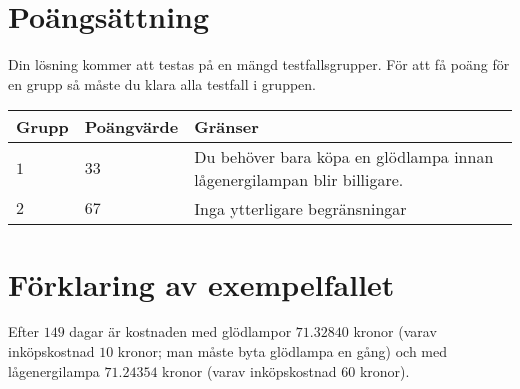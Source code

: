 \section*{Poängsättning}
Din lösning kommer att testas på en mängd testfallsgrupper.
För att få poäng för en grupp så måste du klara alla testfall i gruppen.

\noindent
\begin{tabular}{| l | l | l |}
  \hline
  Grupp & Poängvärde & Gränser \\ \hline
    $1$    & $33$        &  Du behöver bara köpa en glödlampa innan lågenergilampan blir billigare. \\ \hline
  $2$    & $67$        &  Inga ytterligare begränsningar \\ \hline
\end{tabular}

\section*{Förklaring av exempelfallet}
Efter $149$ dagar är kostnaden med glödlampor $71.32840$ kronor (varav inköpskostnad $10$ kronor; man måste byta glödlampa en gång) och med lågenergilampa $71.24354$ kronor (varav inköpskostnad $60$ kronor).
